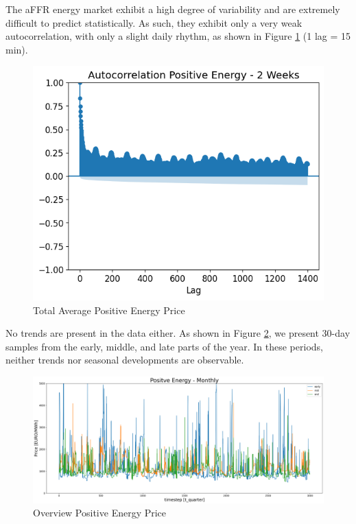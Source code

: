 The aFFR energy market exhibit a high degree of variability and are extremely difficult to predict statistically.
As such, they exhibit only a very weak autocorrelation, with only a slight daily rhythm, as shown in Figure
\ref{fig:Autocorrelation Positive Energy Price} (1 lag = 15 min).

\begin{figure}[!h]
	\includegraphics[width=1\linewidth]{pictures/Autocorrelation Positive Energy - 2 Weeks.png}
	\caption{Total Average Positive Energy Price}
	\label{fig:Autocorrelation Positive Energy Price}
\end{figure}

No trends are present in the data either.
As shown in Figure \ref{fig:posEngOverview}, we present 30-day samples from the early, middle, and late parts of the year.
In these periods, neither trends nor seasonal developments are observable.

\begin{figure}[!h]
	\includegraphics[width=1\linewidth]{pictures/posEngOverview.png}
	\caption{Overview Positive Energy Price}
	\label{fig:posEngOverview}
\end{figure}

